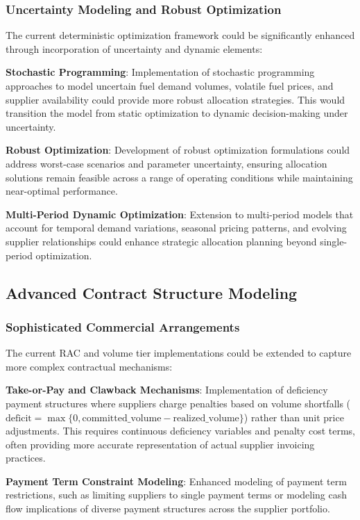 \subsubsection{Uncertainty Modeling and Robust Optimization}
The current deterministic optimization framework could be significantly enhanced through incorporation of uncertainty and dynamic elements:

\textbf{Stochastic Programming}: Implementation of stochastic programming approaches to model uncertain fuel demand volumes, volatile fuel prices, and supplier availability could provide more robust allocation strategies. This would transition the model from static optimization to dynamic decision-making under uncertainty.

\textbf{Robust Optimization}: Development of robust optimization formulations could address worst-case scenarios and parameter uncertainty, ensuring allocation solutions remain feasible across a range of operating conditions while maintaining near-optimal performance.

\textbf{Multi-Period Dynamic Optimization}: Extension to multi-period models that account for temporal demand variations, seasonal pricing patterns, and evolving supplier relationships could enhance strategic allocation planning beyond single-period optimization.

\subsection{Advanced Contract Structure Modeling}

\subsubsection{Sophisticated Commercial Arrangements}
The current RAC and volume tier implementations could be extended to capture more complex contractual mechanisms:

\textbf{Take-or-Pay and Clawback Mechanisms}: Implementation of deficiency payment structures where suppliers charge penalties based on volume shortfalls ($\text{deficit} = \max\{0, \text{committed\_volume} - \text{realized\_volume}\}$) rather than unit price adjustments. This requires continuous deficiency variables and penalty cost terms, often providing more accurate representation of actual supplier invoicing practices.

\textbf{Payment Term Constraint Modeling}: Enhanced modeling of payment term restrictions, such as limiting suppliers to single payment terms or modeling cash flow implications of diverse payment structures across the supplier portfolio.

